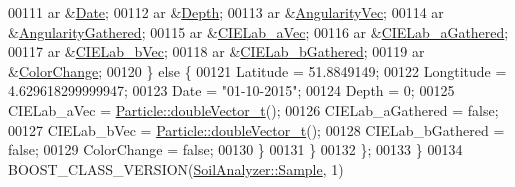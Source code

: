 \begin{DoxyCode}
00111       ar &\hyperlink{class_soil_analyzer_1_1_sample_a9d97841637bbbba5b50b62d51b1b1b81}{Date};
00112       ar &\hyperlink{class_soil_analyzer_1_1_sample_a61d5788ae61e9fd62f8bff35bd0bc068}{Depth};
00113       ar &\hyperlink{class_soil_analyzer_1_1_sample_acca7131a8f178a96e70ed597772243a6}{AngularityVec};
00114       ar &\hyperlink{class_soil_analyzer_1_1_sample_ace7a85e29feb581a1f667d370daad886}{AngularityGathered};
00115       ar &\hyperlink{class_soil_analyzer_1_1_sample_ad5c684c7875dd7b5daca94925e469005}{CIELab\_aVec};
00116       ar &\hyperlink{class_soil_analyzer_1_1_sample_a359783d2f39e5233ed4383dd28e8c477}{CIELab\_aGathered};
00117       ar &\hyperlink{class_soil_analyzer_1_1_sample_a7d39c10c64aa4815264e70fb96360448}{CIELab\_bVec};
00118       ar &\hyperlink{class_soil_analyzer_1_1_sample_a579a9c20e5011249037f28faae8a6415}{CIELab\_bGathered};
00119       ar &\hyperlink{class_soil_analyzer_1_1_sample_accbcd4ae4cc33c94a1b1a4d255d4868f}{ColorChange};
00120     \} \textcolor{keywordflow}{else} \{
00121       Latitude = 51.8849149;
00122       Longtitude = 4.629618299999947;
00123       Date = \textcolor{stringliteral}{"01-10-2015"};
00124       Depth = 0;
00125       CIELab\_aVec = \hyperlink{class_soil_analyzer_1_1_particle_a4ae1bf667c41c7df60cc933e9e5f82eb}{Particle::doubleVector\_t}();
00126       CIELab\_aGathered = \textcolor{keyword}{false};
00127       CIELab\_bVec = \hyperlink{class_soil_analyzer_1_1_particle_a4ae1bf667c41c7df60cc933e9e5f82eb}{Particle::doubleVector\_t}();
00128       CIELab\_bGathered = \textcolor{keyword}{false};
00129       ColorChange = \textcolor{keyword}{false};
00130     \}
00131   \}
00132 \};
00133 \}
00134 BOOST\_CLASS\_VERSION(\hyperlink{class_soil_analyzer_1_1_sample}{SoilAnalyzer::Sample}, 1)
\end{DoxyCode}
